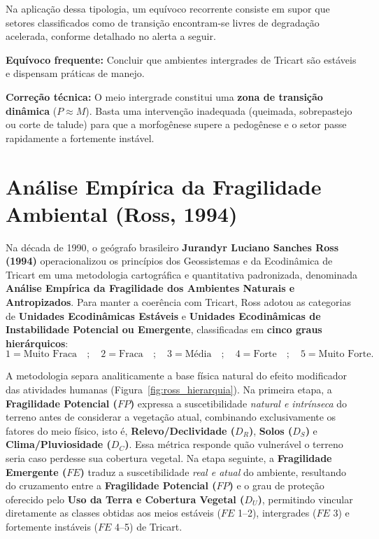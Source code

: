 Na aplicação dessa tipologia, um equívoco recorrente consiste em supor que setores classificados como de transição encontram-se livres de degradação acelerada, conforme detalhado no alerta a seguir.

\begin{boxErro}
\textbf{Equívoco frequente:} Concluir que ambientes intergrades de Tricart são estáveis e dispensam práticas de manejo.\par
\textbf{Correção técnica:} O meio intergrade constitui uma \textbf{zona de transição dinâmica} ($P \approx M$). Basta uma intervenção inadequada (queimada, sobrepastejo ou corte de talude) para que a morfogênese supere a pedogênese e o setor passe rapidamente a fortemente instável.
\end{boxErro}

\section{Análise Empírica da Fragilidade Ambiental (Ross, 1994)}

Na década de 1990, o geógrafo brasileiro \textbf{Jurandyr Luciano Sanches Ross (1994)} operacionalizou os princípios dos Geossistemas e da Ecodinâmica de Tricart em uma metodologia cartográfica e quantitativa padronizada, denominada \textbf{Análise Empírica da Fragilidade dos Ambientes Naturais e Antropizados}. Para manter a coerência com Tricart, Ross adotou as categorias de \textbf{Unidades Ecodinâmicas Estáveis} e \textbf{Unidades Ecodinâmicas de Instabilidade Potencial ou Emergente}, classificadas em \textbf{cinco graus hierárquicos}:
\[
  1 = \text{Muito Fraca} \quad;\quad 2 = \text{Fraca} \quad;\quad 3 = \text{Média} \quad;\quad 4 = \text{Forte} \quad;\quad 5 = \text{Muito Forte}.
\]

A metodologia separa analiticamente a base física natural do efeito modificador das atividades humanas (Figura~\ref{fig:ross_hierarquia}). Na primeira etapa, a \textbf{Fragilidade Potencial ($FP$)} expressa a suscetibilidade \emph{natural e intrínseca} do terreno antes de considerar a vegetação atual, combinando exclusivamente os fatores do meio físico, isto é, \textbf{Relevo/Declividade ($D_R$)}, \textbf{Solos ($D_S$)} e \textbf{Clima/Pluviosidade ($D_C$)}. Essa métrica responde quão vulnerável o terreno seria caso perdesse sua cobertura vegetal. Na etapa seguinte, a \textbf{Fragilidade Emergente ($FE$)} traduz a suscetibilidade \emph{real e atual} do ambiente, resultando do cruzamento entre a \textbf{Fragilidade Potencial ($FP$)} e o grau de proteção oferecido pelo \textbf{Uso da Terra e Cobertura Vegetal ($D_U$)}, permitindo vincular diretamente as classes obtidas aos meios estáveis ($FE$ 1--2), intergrades ($FE$ 3) e fortemente instáveis ($FE$ 4--5) de Tricart.

